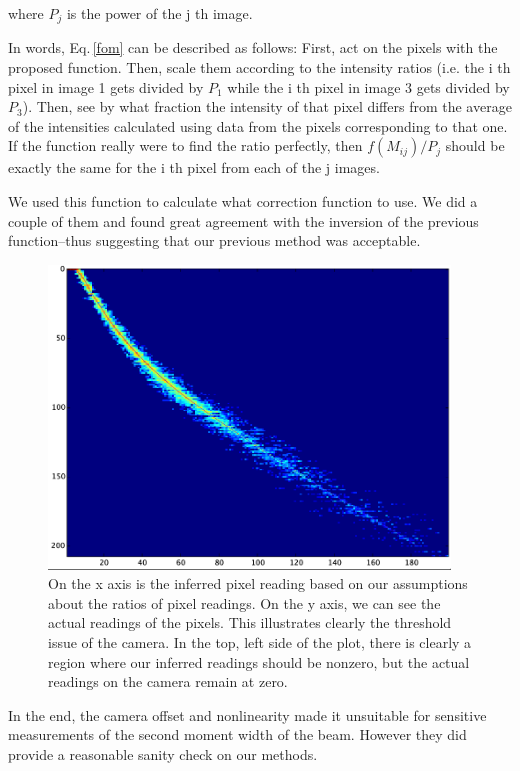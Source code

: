 where $P_j$ is the power of the j th image.

In words, Eq.\,\ref{fom} can be described as follows: First, act on the pixels with the proposed function. Then, scale them according to the intensity ratios (i.e. the i th pixel in image 1 gets divided by $P_1$ while the i th pixel in image 3 gets divided by $P_3$). Then, see by what fraction the intensity of that pixel differs from the average of the intensities calculated using data from the pixels corresponding to that one. If the function really were to find the ratio perfectly, then $f(M_{ij})/P_j$ should be exactly the same for the i th pixel from each of the j images. 


We used this function to calculate what correction function to use. We did a couple of them and found great agreement with the inversion of the previous function--thus suggesting that our previous method was acceptable. 


\begin{figure}
\centerline{
\includegraphics[width=0.95\textwidth]{cameraPixelFit}
}
\caption[Camera linearity and offset]{On the x axis is the inferred pixel reading based on our assumptions about the ratios of pixel readings. On the y axis, we can see the actual readings of the pixels. This illustrates clearly the threshold issue of the camera. In the top, left side of the plot, there is clearly a region where our inferred readings should be nonzero, but the actual readings on the camera remain at zero.\label{cameraPixelFit}}
\end{figure}

In the end, the camera offset and nonlinearity made it unsuitable for sensitive measurements of the second moment width of the beam. However they did provide a reasonable sanity check on our methods.
%
